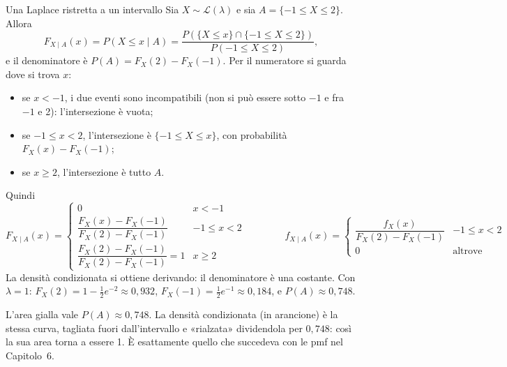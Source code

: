 \begin{esempio}{Una Laplace ristretta a un intervallo}
Sia $X \sim \mathcal{L}(\lambda)$ e sia $A = \{-1 \leq X \leq 2\}$. Allora
\[ F_{X \mid A}(x) = P(X \leq x \mid A) = \frac{P(\{X \leq x\} \cap \{-1 \leq X \leq 2\})}{P(-1 \leq X \leq 2)} , \]
e il denominatore è $P(A) = F_X(2) - F_X(-1)$. Per il numeratore si guarda dove si trova $x$:
\begin{itemize}
  \item se $x < -1$, i due eventi sono incompatibili (non si può essere sotto $-1$ e fra $-1$ e 2): l'intersezione è
        vuota;
  \item se $-1 \leq x < 2$, l'intersezione è $\{-1 \leq X \leq x\}$, con probabilità $F_X(x) - F_X(-1)$;
  \item se $x \geq 2$, l'intersezione è tutto $A$.
\end{itemize}
Quindi
\[
  F_{X \mid A}(x) =
  \begin{cases}
    0 & x < -1 \\[1mm]
    \dfrac{F_X(x) - F_X(-1)}{F_X(2) - F_X(-1)} & -1 \leq x < 2 \\[3mm]
    \dfrac{F_X(2) - F_X(-1)}{F_X(2) - F_X(-1)} = 1 & x \geq 2
  \end{cases}
  \qquad\qquad
  f_{X \mid A}(x) =
  \begin{cases}
    \dfrac{f_X(x)}{F_X(2) - F_X(-1)} & -1 \leq x < 2 \\[3mm]
    0 & \text{altrove}
  \end{cases}
\]
La densità condizionata si ottiene derivando: il denominatore è una costante. Con $\lambda = 1$:
$F_X(2) = 1 - \frac12 e^{-2} \approx 0{,}932$, $F_X(-1) = \frac12 e^{-1} \approx 0{,}184$, e $P(A) \approx 0{,}748$.
\begin{center}
\end{center}
L'area gialla vale $P(A) \approx 0{,}748$. La densità condizionata (in arancione) è la stessa curva, tagliata fuori
dall'intervallo e «rialzata» dividendola per $0{,}748$: così la sua area torna a essere 1. È esattamente quello che
succedeva con le pmf nel Capitolo~6.
\end{esempio}

